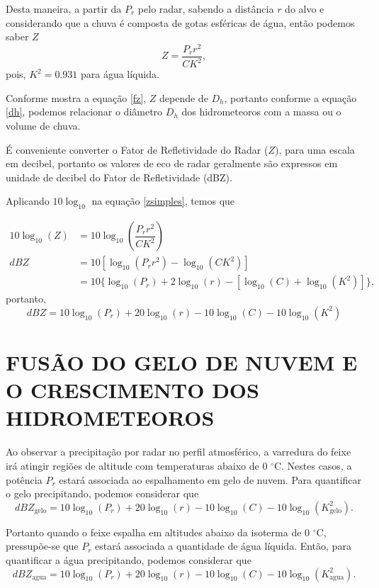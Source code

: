 Desta maneira, a partir da $P_r$ pelo radar, sabendo a distância $r$ do alvo e considerando que a chuva é composta de gotas esféricas de água, então podemos saber $Z$ 
\begin{equation}
Z = \dfrac{P_r r^2}{C K^2},
\label{zsimples}
\end{equation}
pois, $K^2=0.931$ para água líquida.


Conforme mostra a equação \ref{fz}, $Z$ depende de $D_h$, portanto conforme a equação \ref{dh}, podemos relacionar o diâmetro $D_h$ dos hidrometeoros com a massa ou o volume de chuva.  

É conveniente converter o Fator de Refletividade do Radar ($Z$), para uma escala em decibel, portanto os valores de eco de radar geralmente são expressos em unidade de decibel do Fator de Refletividade (dBZ). 

Aplicando $10\log_{10}$ na equação \ref{zsimples}, temos que

\begin{align}
10\log_{10}(Z)  &= 10\log_{10} \left( \dfrac{P_r r^2}{C K^2} \right)\\
dBZ &= 10\left[ \log_{10}(P_r r^2) - \log_{10}(C K^2)     \right]\\
      &=  10 \lbrace \log_{10}(P_r)+ 2\log_{10}(r) - [ \log_{10}(C) + \log_{10}(K^2)]  \rbrace,
\end{align}
portanto,
\begin{equation}
dBZ =  10\log_{10}(P_r) + 20\log_{10}(r) - 10\log_{10}(C) - 10\log_{10}(K^2)
\end{equation}

\section{FUSÃO DO GELO DE NUVEM E O CRESCIMENTO DOS HIDROMETEOROS}

Ao observar a precipitação por radar no perfil atmosférico, a varredura do feixe irá atingir regiões de altitude com temperaturas abaixo de 0 $^{\circ}$C. Nestes casos, a potência $P_r$ estará associada ao espalhamento em gelo de nuvem. Para quantificar o gelo precipitando, podemos considerar que 
\begin{equation}
dBZ_{\mathrm{gelo}} =  10\log_{10}(P_r) + 20\log_{10}(r) - 10\log_{10}(C) - 10\log_{10}(K_{\mathrm{gelo}}^2).
\label{zg}
\end{equation}

Portanto quando o feixe espalha em altitudes abaixo da isoterma de 0 $^{\circ}$C, pressupõe-se que $P_r$ estará associada a quantidade de água líquida. Então, para quantificar a água precipitando, podemos considerar que
\begin{equation}
dBZ_{\mathrm{agua}} =  10\log_{10}(P_r) + 20\log_{10}(r) - 10\log_{10}(C) - 10\log_{10}(K_{\mathrm{agua}}^2).
\label{za}
\end{equation}

